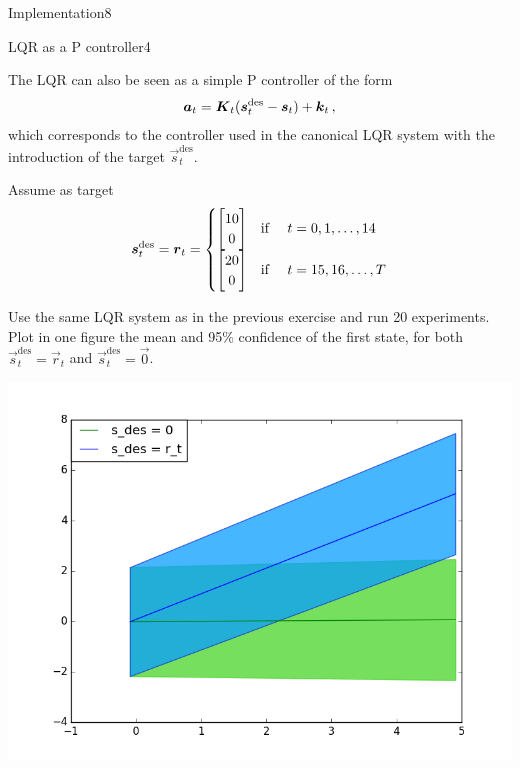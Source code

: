 \begin{questions}
\begin{question}{Implementation}{8}
\end{question}


\begin{question}{LQR as a P controller}{4}

	The LQR can also be seen as a simple P controller of the form
	\begin{align}
		\vec a_t = \mat K_t (\vec s^\text{des}_t - \vec s_t) + \vec k_t\,,
	\end{align}
	which corresponds to the controller used in the canonical LQR system with the introduction of the target $\vec s^\text{des}_t$.
	
	Assume as target 
	\begin{align}
        \vec s^\text{des}_t = \vec r_t = \begin{cases}
        \begin{bmatrix}
        10\\
        0
        \end{bmatrix}  & \text{if \quad} t=0,1,\ldots,14
        \\
        \begin{bmatrix}
        20\\
        0
        \end{bmatrix}  & \text{if \quad} t=15,16,\ldots,T
        \end{cases}	
	\end{align}
    
    Use the same LQR system as in the previous exercise and run 20 experiments. Plot in one figure the mean and 95\% confidence of the first state, for both $\vec s^\text{des}_t = \vec r_t$ and $\vec s^\text{des}_t = \vec 0$.

\begin{answer}
\includegraphics[scale=0.35,trim=0mm 0mm 0mm 0mm,clip=true]{states_b.png}
\end{answer}
\end{question}


\end{questions}
